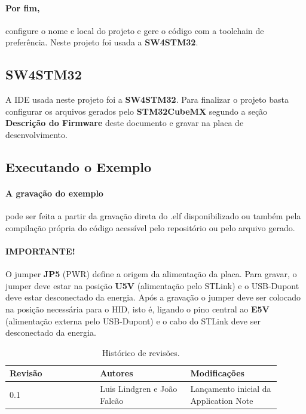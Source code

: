 \documentclass[a4paper,twocolumn,twoside,11pt]{article}
\begin{document}
\paragraph{Por fim,} configure o nome e local do projeto e gere o código com a toolchain de preferência. Neste projeto foi usada a \textbf{SW4STM32}.

\subsection{SW4STM32}
A IDE usada neste projeto foi a \textbf{SW4STM32}. Para finalizar o projeto basta configurar os arquivos gerados pelo \textbf{STM32CubeMX} segundo a seção \textbf{Descrição do Firmware} deste documento e gravar na placa de desenvolvimento.

\subsection{Executando o Exemplo}
\paragraph{A gravação do exemplo}pode ser feita a partir da gravação direta do .elf disponibilizado ou também pela compilação própria do código acessível pelo repositório ou pelo arquivo gerado.

\paragraph{IMPORTANTE!} O jumper \textbf{JP5} (PWR) define a origem da alimentação da placa. Para gravar, o jumper deve estar na posição \textbf{U5V} (alimentação pelo STLink) e o USB-Dupont deve estar desconectado da energia. Após a gravação o jumper deve ser colocado na posição necessária para o HID, isto é, ligando o pino central ao \textbf{E5V} (alimentação externa pelo USB-Dupont) e o cabo do STLink deve ser desconectado da energia.

\newpage
\clearpage
\pagestyle{last}
\begin{onecolumn}
\begin{table}[!ht]%
\caption{Histórico de revisões.}
\label{}
\centering
\begin{tabular}{p{0.3\linewidth}p{0.3\linewidth}p{0.3\linewidth}}
\hline
Revisão & Autores & Modificações\\
\hline
0.1 & Luis Lindgren e João Falcão & Lançamento inicial da Application Note\\
\hline
\end{tabular}
\end{table}
\end{onecolumn}
\end{document}
